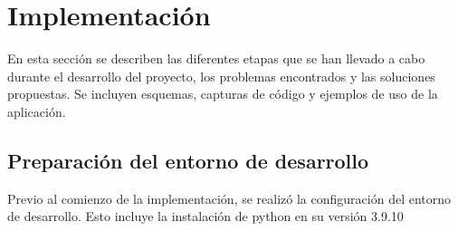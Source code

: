 \chapter{Implementación}

En esta sección se describen las diferentes etapas que se han llevado a cabo durante el desarrollo del proyecto, los problemas encontrados y las soluciones propuestas. Se incluyen esquemas, capturas de código y ejemplos de uso de la aplicación.\newline

\section{Preparación del entorno de desarrollo}

Previo al comienzo de la implementación, se realizó la configuración del entorno de desarrollo. Esto incluye la instalación de python en su versión 3.9.10